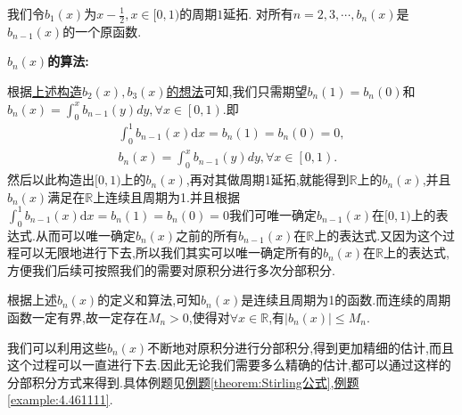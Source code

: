 \documentclass[../../main.tex]{subfiles}
\begin{document}
\begin{definition}[\(b_n(x)\)定义和算法]\label{definition:b_n(x)定义和算法}
我们令\(b_1(x)\)为\(x-\frac{1}{2},x\in[0,1)\)的周期\(1\)延拓. 对所有\(n=2,3,\cdots,b_n(x)\)是\(b_{n - 1}(x)\)的一个原函数.
\end{definition}
\begin{note}
\textbf{\(b_n(x)\)的算法:}

根据\hyperlink{remark:利用0阶E-M公式精细估阶的构造}{上述构造$b_2(x),b_3(x)$的想法}可知,我们只需期望\(b_n(1)=b_n(0)\)和$b_n(x)=\int_0^x{b_{n-1}\left( y \right) dy},\forall x\in \left[ 0,1 \right) $.即
\begin{gather*}
\int_{0}^{1}b_{n-1}(x)\mathrm{d}x =b_n(1)=b_n(0)= 0,
\\
b_n(x)=\int_0^x{b_{n-1}\left( y \right) dy},\forall x\in \left[ 0,1 \right).
\end{gather*}
然后以此构造出$[0,1)$上的$b_n(x)$,再对其做周期1延拓,就能得到$\mathbb{R}$上的$b_n(x)$,并且$b_n(x)$满足在$\mathbb{R}$上连续且周期为1.并且根据$\int_{0}^{1}b_{n-1}(x)\mathrm{d}x =b_n(1)=b_n(0)= 0$我们可唯一确定\(b_{n-1}(x)\)在\([0,1)\)上的表达式.从而可以唯一确定$b_n(x)$之前的所有\(b_{n-1}(x)\)在\(\mathbb{R}\)上的表达式.又因为这个过程可以无限地进行下去,所以我们其实可以唯一确定所有的\(b_n(x)\)在\(\mathbb{R}\)上的表达式,方便我们后续可按照我们的需要对原积分进行多次分部积分.

根据上述$b_n(x)$的定义和算法,可知$b_n(x)$是连续且周期为1的函数.而连续的周期函数一定有界,故一定存在$M_n>0$,使得对$\forall x\in \mathbb{R}$,有$\left| b_n(x) \right|\leqslant M_n$.
\end{note}
\begin{remark}
我们可以利用这些$b_n(x)$不断地对原积分进行分部积分,得到更加精细的估计,而且这个过程可以一直进行下去.因此无论我们需要多么精确的估计,都可以通过这样的分部积分方式来得到.具体例题见\hyperref[theorem:Stirling公式]{例题\ref{theorem:Stirling公式}},\hyperref[example:4.461111]{例题\ref{example:4.461111}}.
\end{remark}
\end{document}
